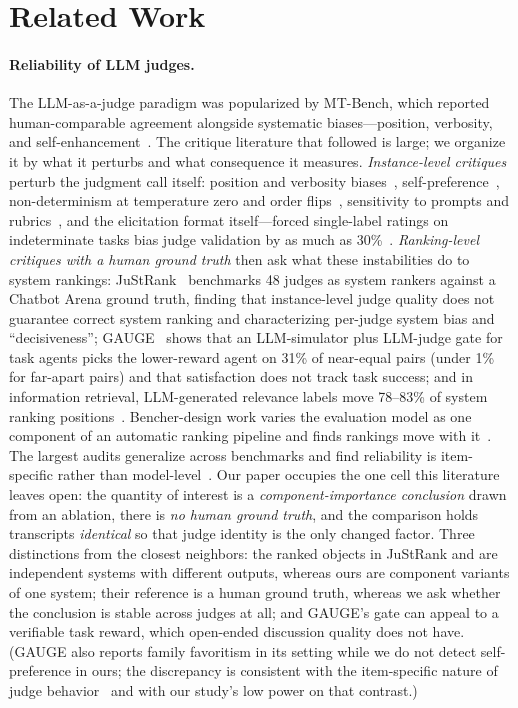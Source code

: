 \section{Related Work}
\label{sec:related}

\paragraph{Reliability of LLM judges.}
The LLM-as-a-judge paradigm was popularized by MT-Bench, which reported
human-comparable agreement alongside systematic biases---position,
verbosity, and self-enhancement~\cite{zheng2023judging}. The critique
literature that followed is large; we organize it by what it perturbs
and what consequence it measures. \emph{Instance-level critiques}
perturb the judgment call itself: position and verbosity
biases~\cite{zheng2023judging}, self-preference~\cite{selfpref2026},
non-determinism at temperature zero and order flips~\cite{allverdicts2026},
sensitivity to prompts and rubrics~\cite{hassell2026mawile}, and the
elicitation format itself---forced single-label ratings on indeterminate
tasks bias judge validation by as much as 30\%~\cite{guerdan2025validating}.
\emph{Ranking-level critiques with a human ground truth} then ask what
these instabilities do to system rankings: JuStRank~\cite{gera-etal-2025-justrank}
benchmarks 48 judges as system rankers against a Chatbot Arena ground
truth, finding that instance-level judge quality does not guarantee
correct system ranking and characterizing per-judge system bias and
``decisiveness''; GAUGE~\cite{bodhwani2026gauge} shows that an
LLM-simulator plus LLM-judge gate for task agents picks the lower-reward
agent on 31\% of near-equal pairs (under 1\% for far-apart pairs) and
that satisfaction does not track task success; and in information
retrieval, LLM-generated relevance labels move 78--83\% of system
ranking positions~\cite{otero2024limitations}. Bencher-design work
varies the evaluation model as one component of an automatic ranking
pipeline and finds rankings move with it~\cite{gao-etal-2025-evaluating}.
The largest audits generalize across benchmarks and find reliability is
item-specific rather than model-level~\cite{reliability2026,
allverdicts2026}. Our paper occupies the one cell this literature leaves
open: the quantity of interest is a \emph{component-importance
conclusion} drawn from an ablation, there is \emph{no human ground
truth}, and the comparison holds transcripts \emph{identical} so that
judge identity is the only changed factor. Three distinctions from the
closest neighbors: the ranked objects in JuStRank and
\cite{gao-etal-2025-evaluating} are independent systems with different
outputs, whereas ours are component variants of one system; their
reference is a human ground truth, whereas we ask whether the conclusion
is stable across judges at all; and GAUGE's gate can appeal to a
verifiable task reward, which open-ended discussion quality does not
have. (GAUGE also reports family favoritism in its setting while we do
not detect self-preference in ours; the discrepancy is consistent with
the item-specific nature of judge behavior~\cite{allverdicts2026} and
with our study's low power on that contrast.)

